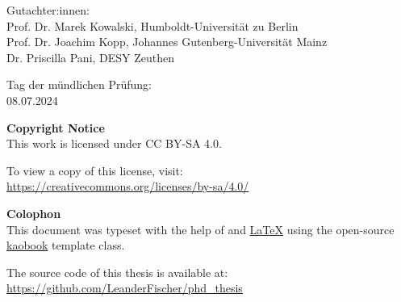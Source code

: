 \begin{center}
	\vspace{0.8cm}
	Gutachter:innen: \\
	Prof. Dr. Marek Kowalski, Humboldt-Universität zu Berlin \\
	Prof. Dr. Joachim Kopp, Johannes Gutenberg-Universität Mainz \\
	Dr. Priscilla Pani, DESY Zeuthen \\

	\vspace{0.5cm}

	Tag der mündlichen Prüfung: \\
	08.07.2024

\end{center}

\newpage
\thispagestyle{plain}

\begin{flushleft}	
	\vspace*{8cm}
	
	\textbf{Copyright Notice} \\
	This work is licensed under CC BY-SA 4.0.

	To view a copy of this license, visit: \\\url{https://creativecommons.org/licenses/by-sa/4.0/}

	\medskip
	
	\textbf{Colophon} \\
	This document was typeset with the help of \href{https://sourceforge.net/projects/koma-script/}{\KOMAScript} and \href{https://www.latex-project.org/}{\LaTeX} using the open-source \href{https://github.com/fmarotta/kaobook/}{kaobook} template class. \\
	
	\medskip
	
	The source code of this thesis is available  at: \\\url{https://github.com/LeanderFischer/phd_thesis}

	\medskip

\end{flushleft}
